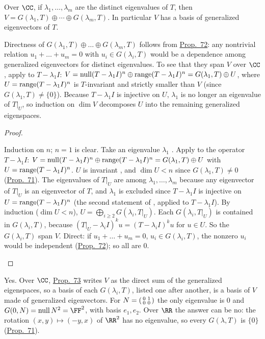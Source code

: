 \documentclass[10pt]{scrartcl}
\begin{document}
\begin{theorem*}\hypertarget{prop-73}{}\label{prop-73}
  Over $\CC$, if $\lambda_1,\dots,\lambda_m$ are the distinct eigenvalues of $T$, then $V=G(\lambda_1,T)\oplus\cdots\oplus G(\lambda_m,T)$. In particular $V$ has a basis of generalized eigenvectors of $T$.
\end{theorem*}
\begin{ideabox}
Directness of $G(\lambda_1,T)\oplus\dots\oplus G(\lambda_m,T)$ follows from \hyperref[prop-72]{Prop.~72}: any nontrivial relation $u_1+\dots+u_m=0$ with $u_i\in G(\lambda_i,T)$ would be a dependence among generalized eigenvectors for distinct eigenvalues. To see that they span $V$ over $\CC$, apply  to $T-\lambda_1I$: $V=\operatorname{null}(T-\lambda_1I)^n\oplus\operatorname{range}(T-\lambda_1I)^n=G(\lambda_1,T)\oplus U$, where $U=\operatorname{range}(T-\lambda_1I)^n$ is $T$-invariant and strictly smaller than $V$ (since $G(\lambda_1,T)\ne\{0\}$). Because $T-\lambda_1I$ is injective on $U$, $\lambda_1$ is no longer an eigenvalue of $T|_U$, so induction on $\dim V$ decomposes $U$ into the remaining generalized eigenspaces.
\end{ideabox}
\begin{proof}
  \begin{steps}
    \ii Induction on $n$; $n=1$ is clear. Take an eigenvalue $\lambda_1$ .
    \ii Apply  to the operator $T-\lambda_1I$: $V=\operatorname{null}(T-\lambda_1I)^n\oplus\operatorname{range}(T-\lambda_1I)^n=G(\lambda_1,T)\oplus U$ with $U=\operatorname{range}(T-\lambda_1I)^n$. $U$ is invariant , and $\dim U<n$ since $G(\lambda_1,T)\ne0$ (\hyperref[prop-71]{Prop.~71}).
    \ii The eigenvalues of $T|_U$ are among $\lambda_1,\dots,\lambda_m$ because any eigenvector of $T|_U$ is an eigenvector of $T$, and $\lambda_1$ is excluded since $T-\lambda_1I$ is injective on $U=\operatorname{range}(T-\lambda_1I)^n$ (the second statement of , applied to $T-\lambda_1I$).
    \ii By induction ($\dim U<n$), $U=\bigoplus_{i\ge2}G(\lambda_i,T|_U)$. Each $G(\lambda_i,T|_U)$ is contained in $G(\lambda_i,T)$, because $(T|_U-\lambda_iI)^ku=(T-\lambda_iI)^ku$ for $u\in U$.
    \ii So the $G(\lambda_i,T)$ span $V$. Direct: if $u_1+\dots+u_m=0$, $u_i\in G(\lambda_i,T)$, the nonzero $u_i$ would be independent (\hyperref[prop-72]{Prop.~72}); so all are $0$.
  \end{steps}
\end{proof}
\revisit Yes. Over $\CC$, \hyperref[prop-73]{Prop.~73} writes $V$ as the direct sum of the generalized eigenspaces, so a basis of each $G(\lambda_i,T)$, listed one after another, is a basis of $V$ made of generalized eigenvectors. For $N=\begin{psmallmatrix}0&1\\0&0\end{psmallmatrix}$ the only eigenvalue is $0$ and $G(0,N)=\nul N^2=\FF^2$, with basis $e_1,e_2$. Over $\RR$ the answer can be no: the rotation $(x,y)\mapsto(-y,x)$ of $\RR^2$ has no eigenvalue, so every $G(\lambda,T)$ is $\{0\}$ (\hyperref[prop-71]{Prop.~71}).
\end{document}
